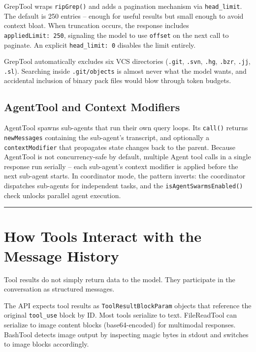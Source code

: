 \documentclass[
  english,
  11pt,
  letterpaper,
]{book}
\begin{document}
GrepTool wraps \texttt{ripGrep()} and adds a pagination mechanism via
\texttt{head\_limit}. The default is 250 entries -- enough for useful
results but small enough to avoid context bloat. When truncation occurs,
the response includes \texttt{appliedLimit:\ 250}, signaling the model
to use \texttt{offset} on the next call to paginate. An explicit
\texttt{head\_limit:\ 0} disables the limit entirely.

GrepTool automatically excludes six VCS directories (\texttt{.git},
\texttt{.svn}, \texttt{.hg}, \texttt{.bzr}, \texttt{.jj}, \texttt{.sl}).
Searching inside \texttt{.git/objects} is almost never what the model
wants, and accidental inclusion of binary pack files would blow through
token budgets.

\subsection{AgentTool and Context
Modifiers}\label{agenttool-and-context-modifiers}

AgentTool spawns sub-agents that run their own query loops. Its
\texttt{call()} returns \texttt{newMessages} containing the sub-agent's
transcript, and optionally a \texttt{contextModifier} that propagates
state changes back to the parent. Because AgentTool is not
concurrency-safe by default, multiple Agent tool calls in a single
response run serially -- each sub-agent's context modifier is applied
before the next sub-agent starts. In coordinator mode, the pattern
inverts: the coordinator dispatches sub-agents for independent tasks,
and the \texttt{isAgentSwarmsEnabled()} check unlocks parallel agent
execution.

\begin{center}\rule{0.5\linewidth}{0.5pt}\end{center}

\section{How Tools Interact with the Message
History}\label{how-tools-interact-with-the-message-history}

Tool results do not simply return data to the model. They participate in
the conversation as structured messages.

The API expects tool results as \texttt{ToolResultBlockParam} objects
that reference the original \texttt{tool\_use} block by ID. Most tools
serialize to text. FileReadTool can serialize to image content blocks
(base64-encoded) for multimodal responses. BashTool detects image output
by inspecting magic bytes in stdout and switches to image blocks
accordingly.
\end{document}
